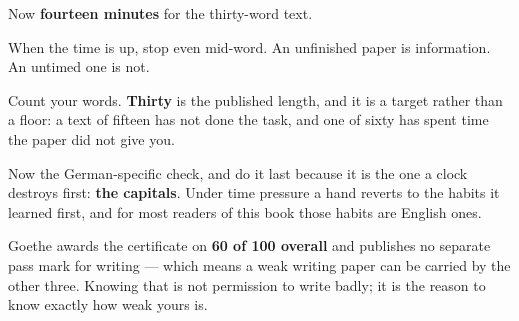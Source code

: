 Now \textbf{fourteen minutes} for the thirty-word text.

When the time is up, stop even mid-word. An unfinished paper is information. An untimed one is not.

\begin{tcolorbox}[breakable,colback=teal!4,colframe=teal!35!black,title={Before you move on}]
Count your words. \textbf{Thirty} is the published length, and it is a target rather than a floor: a text of fifteen has not done the task, and one of sixty has spent time the paper did not give you.

Now the German-specific check, and do it last because it is the one a clock destroys first: \textbf{the capitals}. Under time pressure a hand reverts to the habits it learned first, and for most readers of this book those habits are English ones.

Goethe awards the certificate on \textbf{60 of 100 overall} and publishes no separate pass mark for writing — which means a weak writing paper can be carried by the other three. Knowing that is not permission to write badly; it is the reason to know exactly how weak yours is.
\end{tcolorbox}
